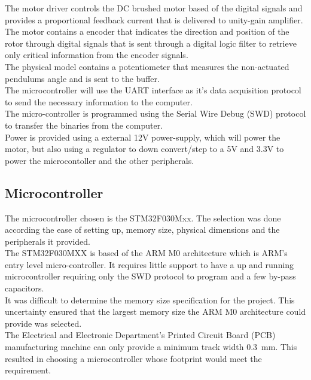 The motor driver controls the DC brushed motor based of the digital signals and provides a proportional feedback current that is delivered to unity-gain amplifier.\\

The motor contains a encoder that indicates the direction and position of the rotor through digital signals that is sent through a digital logic filter to retrieve only critical information from the encoder signals. \\

The physical model contains a potentiometer that measures the non-actuated pendulums angle and is sent to the buffer.\\

The microcontroller will use the UART interface as it's data acquisition protocol to send the necessary information to the computer. \\

The micro-controller is programmed using the Serial Wire Debug (SWD) protocol to transfer the binaries from the computer.\\

Power is provided using a external 12V power-supply, which will power the motor, but also using a regulator to down convert/step to a 5V and 3.3V to power the microcontoller and the other peripherals.


\subsection{Microcontroller}
The microcontroller chosen is the STM32F030Mxx. The selection was done according the ease of setting up, memory size, physical dimensions and the peripherals it provided.\\

The STM32F030MXX is based of the ARM M0 architecture which is ARM's entry level micro-controller. It requires little support to have a up and running microcontroller requiring only the SWD protocol to program and a few by-pass capacitors.\\

It was difficult to determine the memory size specification for the project. This uncertainty ensured that the largest memory size the ARM M0 architecture could provide was selected.\\

The Electrical and Electronic Department's Printed Circuit Board (PCB) manufacturing machine can only provide a  minimum track width \SI{0.3}{mm}. This resulted in choosing a microcontroller whose footprint would meet the requirement.\\

